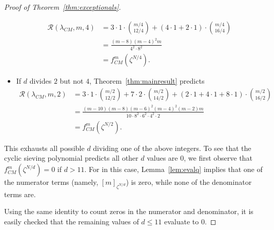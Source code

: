 \documentclass[12pt]{amsart}
\theoremstyle{definition}
\theoremstyle{remark}
\numberwithin{equation}{section}
\begin{document}
\begin{proof}[Proof of Theorem~\ref{thm:exceptionals}]
\begin{itemize}
\begin{align*}
\mathcal{R}(\lambda_{CM},m,4) &= 3 \cdot 1 \cdot \binom{m/4}{12/4} + (4 \cdot 1 + 2 \cdot 1) \cdot \binom{m/4}{16/4}  \\
&= \frac{(m-8)(m-4)^2m}{4^2 \cdot 8^2} \\
&= f_{CM}^m(\zeta^{N/4}).
\end{align*}
\item If $d$ divides $2$ but not $4$, Theorem~\ref{thm:mainresult} predicts
\begin{align*}
\mathcal{R}(\lambda_{CM},m,2) &= 3 \cdot 1 \cdot \binom{m/2}{12/2} + 7 \cdot 2 \cdot \binom{m/2}{14/2} + (2 \cdot 1 + 4 \cdot 1 + 8 \cdot 1) \cdot \binom{m/2}{16/2} \\
&= \frac{(m-10)(m-8)(m-6)^2(m-4)^2(m-2)m}{10 \cdot 8^2 \cdot 6^2 \cdot  4^2 \cdot 2}\\
&= f_{CM}^m(\zeta^{N/2}).
\end{align*}
\end{itemize}
This exhausts all possible $d$ dividing one of the above integers. To see that the cyclic sieving polynomial predicts all other $d$ values are $0$, we first observe that $f_{CM}^m(\zeta^{N/d}) = 0$ if $d > 11$. For in this case, Lemma~\ref{lem:evalq} implies that one of the numerator terms (namely, $[m]_{\zeta^{N/d}}$) is zero, while none of the denominator terms are. 

Using the same identity to count zeros in the numerator and denominator, it is easily checked that the remaining values of $d \leq 11$ evaluate to $0$. 
\end{proof}
\end{document}
